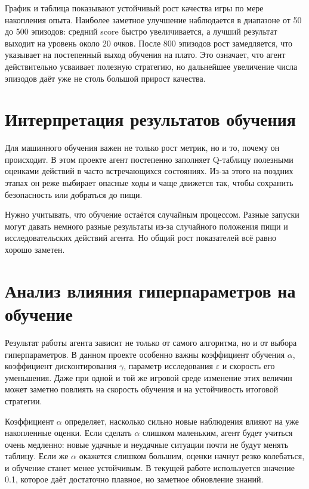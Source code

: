 График и таблица показывают устойчивый рост качества игры по мере накопления опыта. Наиболее заметное улучшение наблюдается в диапазоне от 50 до 500 эпизодов: средний score быстро увеличивается, а лучший результат выходит на уровень около 20 очков. После 800 эпизодов рост замедляется, что указывает на постепенный выход обучения на плато. Это означает, что агент действительно усваивает полезную стратегию, но дальнейшее увеличение числа эпизодов даёт уже не столь большой прирост качества.

\section{Интерпретация результатов обучения}

Для машинного обучения важен не только рост метрик, но и то, почему он происходит. В этом проекте агент постепенно заполняет Q-таблицу полезными оценками действий в часто встречающихся состояниях. Из-за этого на поздних этапах он реже выбирает опасные ходы и чаще движется так, чтобы сохранить безопасность или добраться до пищи.

Нужно учитывать, что обучение остаётся случайным процессом. Разные запуски могут давать немного разные результаты из-за случайного положения пищи и исследовательских действий агента. Но общий рост показателей всё равно хорошо заметен.

\section{Анализ влияния гиперпараметров на обучение}

Результат работы агента зависит не только от самого алгоритма, но и от выбора гиперпараметров. В данном проекте особенно важны коэффициент обучения $\alpha$, коэффициент дисконтирования $\gamma$, параметр исследования $\varepsilon$ и скорость его уменьшения. Даже при одной и той же игровой среде изменение этих величин может заметно повлиять на скорость обучения и на устойчивость итоговой стратегии.

Коэффициент $\alpha$ определяет, насколько сильно новые наблюдения влияют на уже накопленные оценки. Если сделать $\alpha$ слишком маленьким, агент будет учиться очень медленно: новые удачные и неудачные ситуации почти не будут менять таблицу. Если же $\alpha$ окажется слишком большим, оценки начнут резко колебаться, и обучение станет менее устойчивым. В текущей работе используется значение 0.1, которое даёт достаточно плавное, но заметное обновление знаний.

